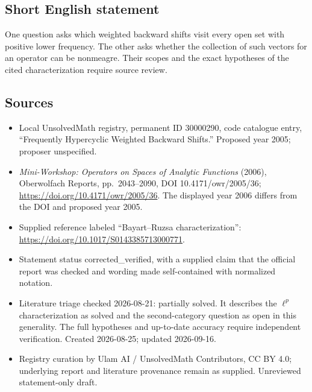 \documentclass[11pt]{article}
\begin{document}
\subsection{Short English statement}
One question asks which weighted backward shifts visit every open set with positive lower frequency. The other asks whether the collection of such vectors for an operator can be nonmeagre. Their scopes and the exact hypotheses of the cited characterization require source review.
\subsection{Sources}
\begin{itemize}
\item Local UnsolvedMath registry, permanent ID 30000290, code catalogue entry, ``Frequently Hypercyclic Weighted Backward Shifts.'' Proposed year 2005; proposer unspecified.
\item \emph{Mini-Workshop: Operators on Spaces of Analytic Functions} (2006), Oberwolfach Reports, pp.\ 2043--2090, DOI 10.4171/owr/2005/36; \url{https://doi.org/10.4171/owr/2005/36}. The displayed year 2006 differs from the DOI and proposed year 2005.
\item Supplied reference labeled ``Bayart--Ruzsa characterization'': \url{https://doi.org/10.1017/S0143385713000771}.
\item Statement status corrected\_verified, with a supplied claim that the official report was checked and wording made self-contained with normalized notation.
\item Literature triage checked 2026-08-21: partially solved. It describes the $\ell^p$ characterization as solved and the second-category question as open in this generality. The full hypotheses and up-to-date accuracy require independent verification. Created 2026-08-25; updated 2026-09-16.
\item Registry curation by Ulam AI / UnsolvedMath Contributors, CC BY 4.0; underlying report and literature provenance remain as supplied. Unreviewed statement-only draft.
\end{itemize}
\end{document}
